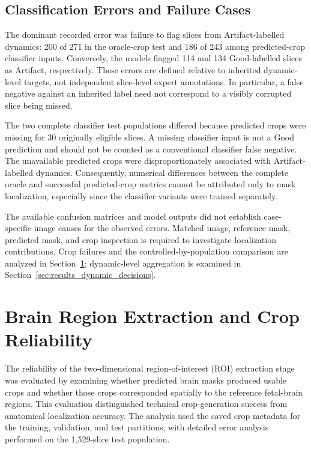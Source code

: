 \subsection{Classification Errors and Failure Cases}

The dominant recorded error was failure to flag slices from Artifact-labelled dynamics: 200 of 271 in the oracle-crop test and 186 of 243 among predicted-crop classifier inputs. Conversely, the models flagged 114 and 134 Good-labelled slices as Artifact, respectively. These errors are defined relative to inherited dynamic-level targets, not independent slice-level expert annotations. In particular, a false negative against an inherited label need not correspond to a visibly corrupted slice being missed.

The two complete classifier test populations differed because predicted crops were missing for 30 originally eligible slices. A missing classifier input is not a Good prediction and should not be counted as a conventional classifier false negative. The unavailable predicted crops were disproportionately associated with Artifact-labelled dynamics. Consequently, numerical differences between the complete oracle and successful predicted-crop metrics cannot be attributed only to mask localization, especially since the classifier variants were trained separately.

The available confusion matrices and model outputs did not establish case-specific image causes for the observed errors. Matched image, reference mask, predicted mask, and crop inspection is required to investigate localization contributions. Crop failures and the controlled-by-population comparison are analyzed in Section~\ref{sec:results_roi_reliability}; dynamic-level aggregation is examined in Section~\ref{sec:results_dynamic_decisions}.

\section{Brain Region Extraction and Crop Reliability}
\label{sec:results_roi_reliability}

The reliability of the two-dimensional region-of-interest (ROI) extraction stage was evaluated by examining whether predicted brain masks produced usable crops and whether those crops corresponded spatially to the reference fetal-brain regions. This evaluation distinguished technical crop-generation success from anatomical localization accuracy. The analysis used the saved crop metadata for the training, validation, and test partitions, with detailed error analysis performed on the 1,529-slice test population.

